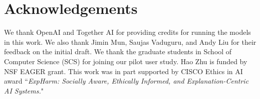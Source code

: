 \ifx\iclrfinalcopy{}
\section*{Acknowledgements}
We thank OpenAI and Together AI for providing credits for running the models in this work.
We also thank Jimin Mun, Saujas Vaduguru, and Andy Liu for their feedback on the initial draft.
We thank the graduate students in School of Computer Science (SCS) for joining our pilot user study. 
Hao Zhu is funded by NSF EAGER grant. 
This work was in part supported by CISCO Ethics in AI award ``\textit{ExpHarm: Socially Aware, Ethically Informed, and Explanation-Centric AI Systems.}"
\fi
